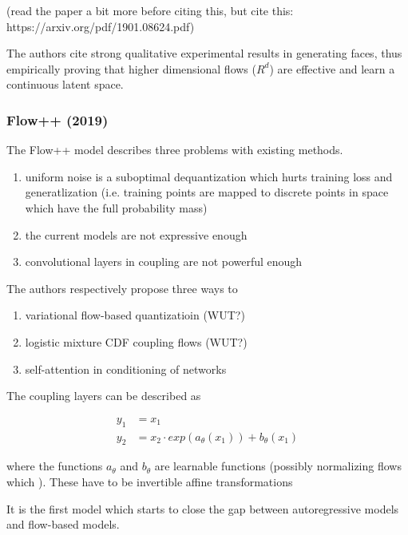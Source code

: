 \documentclass[a4paper,12pt,twoside,openright]{report}
\begin{document}


(read the paper a bit more before citing this, but cite this: https://arxiv.org/pdf/1901.08624.pdf) 

The authors cite strong qualitative experimental results in generating faces, thus empirically proving that higher dimensional flows ($R^d$) are effective and learn a continuous latent space.


\subsubsection{Flow++ (2019)}

The Flow++ model describes three problems with existing methods.

\begin{enumerate}
\item uniform noise is a suboptimal dequantization which hurts training loss and generatlization (i.e. training points are mapped to discrete points in space which have the full probability mass)
\item the current models are not expressive enough
\item convolutional layers in coupling are not powerful enough
\end{enumerate}

The authors respectively propose three ways to

\begin{enumerate}
\item variational flow-based quantizatioin (WUT?)
\item logistic mixture CDF coupling flows (WUT?)
\item self-attention in conditioning of networks
\end{enumerate}

The coupling layers can be described as

\begin{align}
y_1 &= x_1 \\
y_2 &= x_2 \cdot exp( a_\theta( x_1 ) ) + b_\theta(x_1)
\end{align}

where the functions $a_\theta$ and $b_\theta$ are learnable functions (possibly normalizing flows which ). 
These have to be invertible affine transformations

It is the first model which starts to close the gap between autoregressive models and flow-based models.
\end{document}
